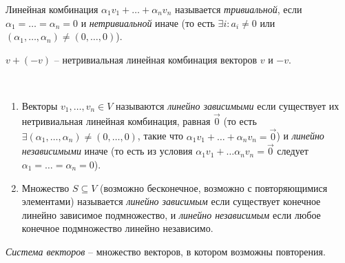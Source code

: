 \begin{definition}
    Линейная комбинация $\alpha_1 v_1 + \dots + \alpha_n v_n$ называется \textit{тривиальной}, если $\alpha_1 = \dots = \alpha_n = 0$ и \textit{нетривиальной} иначе (то есть $\exists i : a_i \neq 0$ или $(\alpha_1, \dots, \alpha_n) \neq (0, \dots, 0)$).
\end{definition}

\begin{example}
    $v + (-v)$ -- нетривиальная линейная комбинация векторов $v$ и $-v$.
\end{example}

\begin{definition}~
    \begin{enumerate}
    \item 
        Векторы $v_1, \dots, v_n \in V $ называются \textit{линейно зависимыми} если существует их нетривиальная линейная комбинация, равная $\overrightarrow{0}$ (то есть $\exists (\alpha_1, \dots, \alpha_n) \neq (0, \dots, 0)$, такие что $\alpha_1 v_1 + \dots + \alpha_n v_n = \overrightarrow{0}$) и \textit{линейно независимыми} иначе (то есть из условия $\alpha_1 v_1 + \dots\alpha_n v_n = \overrightarrow{0}$ следует $\alpha_1 = \dots = \alpha_n = 0$).

    \item
        Множество $S \subseteq V$ (возможно бесконечное, возможно с повторяющимися элементами) называется \textit{линейно зависимым} если существует конечное линейно зависимое подмножество, и \textit{линейно независимым} если любое конечное подмножество линейно независимо.
    \end{enumerate}
\end{definition}

\begin{convention}
    \textit{Система векторов} -- множество векторов, в котором возможны повторения.
\end{convention}

